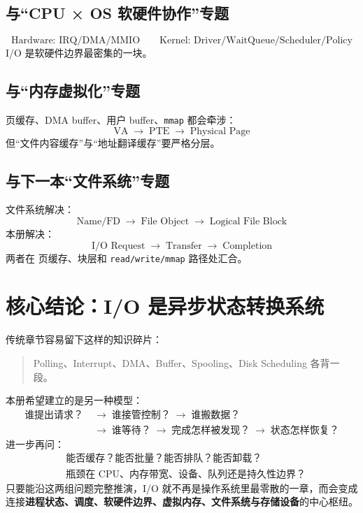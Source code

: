 \documentclass[11pt,a4paper]{ctexart}
\newcommand{\kw}[1]{\textbf{#1}}
\newcommand{\code}[1]{\texttt{#1}}
\newcommand{\arr}{\;\longrightarrow\;}
\begin{document}
\subsection{与“CPU × OS 软硬件协作”专题}
\[
\boxed{
\text{Hardware: IRQ/DMA/MMIO}
\qquad
\text{Kernel: Driver/WaitQueue/Scheduler/Policy}
}
\]
I/O 是软硬件边界最密集的一块。

\subsection{与“内存虚拟化”专题}
页缓存、DMA buffer、用户 buffer、\code{mmap} 都会牵涉：
\[
\text{VA}\arr\text{PTE}\arr\text{Physical Page}
\]
但“文件内容缓存”与“地址翻译缓存”要严格分层。

\subsection{与下一本“文件系统”专题}
文件系统解决：
\[
\boxed{\text{Name/FD}\arr\text{File Object}\arr\text{Logical File Block}}
\]
本册解决：
\[
\boxed{\text{I/O Request}\arr\text{Transfer}\arr\text{Completion}}
\]
两者在 页缓存、块层和 \code{read/write/mmap} 路径处汇合。

\section{核心结论：I/O 是异步状态转换系统}
传统章节容易留下这样的知识碎片：
\begin{quote}
Polling、Interrupt、DMA、Buffer、Spooling、Disk Scheduling 各背一段。
\end{quote}
本册希望建立的是另一种模型：
\[
\boxed{
\begin{aligned}
\text{谁提出请求？}&\arr\text{谁接管控制？}\arr\text{谁搬数据？}\\
&\arr\text{谁等待？}\arr\text{完成怎样被发现？}\arr\text{状态怎样恢复？}
\end{aligned}}
\]
进一步再问：
\[
\boxed{
\begin{aligned}
&\text{能否缓存？能否批量？能否排队？能否卸载？}\\
&\text{瓶颈在 CPU、内存带宽、设备、队列还是持久性边界？}
\end{aligned}}
\]
只要能沿这两组问题完整推演，I/O 就不再是操作系统里最零散的一章，而会变成连接\kw{进程状态、调度、软硬件边界、虚拟内存、文件系统与存储设备}的中心枢纽。

\newpage
\end{document}
